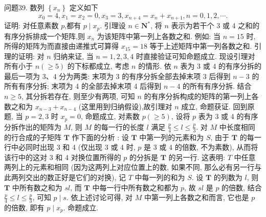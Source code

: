 问题39. 数列 $\left\{x_n\right\}$ 定义如下
$$
x_0=4, x_1=x_2=0, x_3=3, x_{n+4}=x_n+x_{n+1}, n=0,1,2, \cdots .
$$
证明: 对任意素数 $p$,都有 $p \mid x_p$.
引理设 $n \in \mathbf{N}^*$, 将 $n$ 表示为若干个 3 或 4 之和的有序分拆排成一个矩阵,则 $x_n$ 为该矩阵中第一列上各数之和.
例如: 当 $n=15$ 时, 所得的矩阵为而直接由递推式可算得 $x_{15}=18$ 等于上述矩阵中第一列各数之和.
引理的证明: 对 $n$ 归纳来证, 当 $n=1,2,3,4$ 时直接验证可知命题成立.
现设引理对所有小于 $n(\geqslant 5)$ 的下标都成立, 考虑 $n$ 的情形.
依 $n$ 表为 3 或 4 的有序分拆的最后一项为 $3 、 4$ 分为两类: 末项为 3 的有序分拆全部去掉末项 3 后得到 $n-3$ 的所有有序分拆; 末项为 4 的全部去掉末项 4 后得到 $n-4$ 的所有有序分拆.
结合 $n \geqslant 5$, 其分拆若存在, 则至少有两项, 可知 $n$ 的有序分拆构成的矩阵的第一列上各数之和为 $x_{n-3}+x_{n-4}$ (这里用到归纳假设),故引理对 $n$ 成立, 命题获证.
回到原题, 当 $p=2,3$ 时 $x_p=0$, 命题成立, 对素数 $p(\geqslant 5)$, 设将 $p$ 表为 3 或 4 的有序分拆作出的矩阵为 $M$, 则 $M$ 的每一行的长度 $l$ 满足 $\frac{p}{4} \leqslant l \leqslant \frac{p}{3}$.
对 $M$ 中长度相同的行合成的子矩阵 $\boldsymbol{T}$ 作下面的分析 : 设 $\boldsymbol{T}$ 中第一列的元素和为 $S$, 由于 $\boldsymbol{T}$ 的每一行中必同时出现 3 和 4 (仅出现 3 或 4 时, $p$ 是 3 或 4 的倍数, 不为素数), 从而将该行中的这对 3 和 4 对换位置所得的 $p$ 的分拆是 $\boldsymbol{T}$ 的另一行.
这表明: $T$ 中任意两列上的元素和相同 (因为这两列上对应位置上的数, 如果不同, 那么必有另一行与此两列交出的数正好是它们的对换), 记 $T$ 中每一列的和为 $S$. 设 $\boldsymbol{T}$ 的列数为 $l$, 则 $\boldsymbol{T}$ 中所有数之和为 $s l$, 而 $\boldsymbol{T}$ 中每一行中所有数之和都为 $p$, 故 $s l$ 是 $p$ 的倍数, 结合 $\frac{p}{4} \leqslant l \leqslant \frac{p}{3}$, 可知 $p \mid s$.
依上述讨论可得, 对 $M$ 中第一列上各数之和而言, 它也是 $p$ 的倍数, 即有 $p \mid x_p$. 命题成立.



